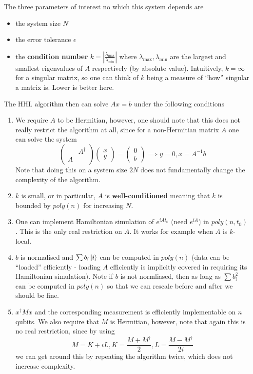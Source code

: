\documentclass{article}
\theoremstyle{definition}
\begin{document}
The three parameters of interest no which this system depends are

\begin{itemize}
\item the system size $N$
\item the error tolerance $\epsilon$
\item the \textbf{condition number} $k = \left|
    \frac{\lambda_{\max}}{\lambda_{\min}} \right|$ where $\lambda_{\max},
  \lambda_{\min}$ are the largest and smallest eigenvalues of $A$ respectively (by
  absolute value). Intuitively, $k=\infty$ for a singular matrix, so one can
  think of $k$ being a measure of ``how'' singular a matrix is. Lower is better
  here.
\end{itemize}

The HHL algorithm then can solve $Ax = b$ under the following conditions

\begin{enumerate}
  \item We require $A$ to be Hermitian, however, one should note that this does
    not really restrict the algorithm at all, since for a non-Hermitian matrix
    $A$ one can solve the system
    $$ \begin{pmatrix} & A^\dagger \\ A & \end{pmatrix} \begin{pmatrix} x \\
      y \end{pmatrix} = \begin{pmatrix} 0 \\ b \end{pmatrix} \implies y = 0, x =
    A^{-1} b $$
    Note that doing this on a system size $2N$ does not fundamentally change the
    complexity of the algorithm.
  \item $k$ is small, or in particular, $A$ is \textbf{well-conditioned} meaning
    that $k$ is bounded by $poly(n)$ for increasing $N$.
  \item One can implement Hamiltonian simulation of $e^{iAt_0}$ (need $e^{iA}$)
    in $poly(n, t_0)$. This is the only real restriction on $A$. It works for
    example when $A$ is $k$-local.
  \item $b$ is normalised and $\sum b_i \ket{i}$ can be computed in $poly(n)$
    (data can be ``loaded'' efficiently - loading $A$ efficiently is implicitly
    covered in requiring its Hamiltonian simulation). Note if $b$ is not
    normliased, then as long as $\sum b_i^2$ can be computed in $poly(n)$ so
    that we can rescale before and after we should be fine.
  \item $x^\dagger M x$ and the corresponding measurement is efficiently
    implementable on $n$ qubits. We also require that $M$ is Hermitian, however,
    note that again this is no real restriction, since by using
    $$ M = K + iL, K = \frac{M + M^\dagger}{2}, L = \frac{M - M^\dagger}{2i} $$
    we can get around this by repeating the algorithm twice, which does not
    increase complexity.
\end{enumerate}
\end{document}
